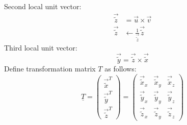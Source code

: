   Second local unit vector:
  \begin{align}
   \vec{\tilde{z}} &= \vec{u} \times \vec{v} \nonumber\\
   \vec{\tilde{z}} &\leftarrow \frac{1}{\vec{\tilde{z}}}\vec{\tilde{z}} \nonumber
  \end{align}
  Third local unit vector:
  \begin{equation}
   \vec{\tilde{y}} = \vec{\tilde{z}} \times \vec{\tilde{x}} \nonumber
  \end{equation}
  Define transformation matrix $T$ as follows:
  \begin{equation}
   \underline{T} = \begin{pmatrix}
   \vec{\tilde{x}}^T\\ \vec{\tilde{y}}^T\\ \vec{\tilde{z}}^T
   \end{pmatrix} = \begin{pmatrix}
   \vec{\tilde{x}}_x & \vec{\tilde{x}}_y & \vec{\tilde{x}}_z\\ \vec{\tilde{y}}_x & \vec{\tilde{y}}_y & \vec{\tilde{y}}_z\\ \vec{\tilde{z}}_x & \vec{\tilde{z}}_y & \vec{\tilde{z}}_z
   \end{pmatrix}
  \end{equation}
 
 
 
